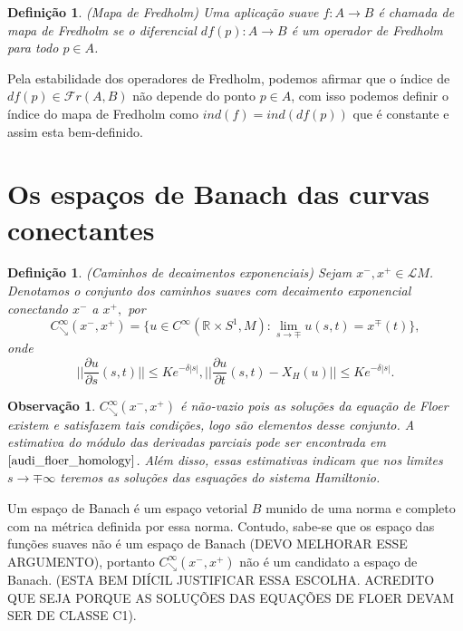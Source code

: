 \documentclass[12pt]{book}
\newtheorem{definicao}[teorema]{Definição}
\newtheorem{observacao}[teorema]{Observação}
\newcommand{\aplicaoessuavesreatacirculo}{C^{\infty}(\retacartesianocirculo, M)}
\newcommand{\caminhosdecaimentoexponencial}[2]{C^{\infty}_{\searrow}(#1, #2)}
\newcommand{\caminhosdecaimentoexponencialpadrao}{\caminhosdecaimentoexponencial{x^{-}}{x^{+}}}
\newcommand{\circulo}{S^{1}}
\newcommand{\derivadaparcial}[2]{\frac{\partial #1}{\partial #2}}
\newcommand{\normagrande}[1]{\Big|\Big|#1\Big|\Big|}
\newcommand{\operadoresfredholm}[2]{\mathcal{F}r(#1, #2)}
\newcommand{\retacartesianocirculo}{\real{} \times \circulo}
\newcommand{\real}[1]{\mathbb{R}^{#1}}
\newcommand{\solucoesperiodicascontrateis}{\mathcal{L}M}
\newcommand{\vermelho}[1]{{\color{red}#1}}
\begin{document}
	\begin{definicao}
		(Mapa de Fredholm) Uma aplicação suave $f: A \to B$ é chamada de mapa de Fredholm se o diferencial $df(p): A \to B$ é um operador de Fredholm para todo $p \in A$.
	\end{definicao}
	
	
	Pela estabilidade dos operadores de Fredholm, podemos afirmar que o índice de $df(p) \in \operadoresfredholm{A}{B}$ não depende do ponto $p \in A$, com isso podemos definir o índice do mapa de Fredholm como $ind(f)=ind(df(p))$ que é constante e assim esta bem-definido.
	
	\section{Os espaços de Banach das curvas conectantes}
	
	\begin{definicao}\label{definicao_caminhos_decaimentos_exponenciais}
		(Caminhos de decaimentos exponenciais) Sejam $x^{-}, x^{+} \in \solucoesperiodicascontrateis$. Denotamos o conjunto dos caminhos suaves com decaimento exponencial conectando $x^{-}$ a $x^{+}, $ por
		$$
		\caminhosdecaimentoexponencialpadrao = \{u \in \aplicaoessuavesreatacirculo: \lim_{s \to \mp} u(s,t) = x^{\mp}(t) \},
		$$
		onde 
		$$
		\normagrande{\derivadaparcial{u}{s}(s,t)} \leq Ke^{-\delta|s|},  \normagrande{\derivadaparcial{u}{t}(s,t) -X_{H}(u)} \leq Ke^{-\delta|s|}.
		$$
	\end{definicao}
	
	\begin{observacao}
		$\caminhosdecaimentoexponencialpadrao$ é não-vazio pois as soluções da equação de Floer existem e satisfazem tais condições, logo são elementos desse conjunto. A estimativa do módulo das derivadas parciais pode ser encontrada em $\cite{audi_floer_homology}$. Além disso, essas estimativas indicam que nos limites $s\to \mp \infty$ teremos as soluções das esquações do sistema Hamiltonio.
	\end{observacao}
	
	Um espaço de Banach é um espaço vetorial $B$ munido de uma norma e completo com na métrica definida por essa norma. Contudo, sabe-se que os espaço das funções suaves não é um espaço de Banach \vermelho{(DEVO MELHORAR ESSE ARGUMENTO)}, portanto $\caminhosdecaimentoexponencialpadrao$ não é um candidato a espaço de Banach. \vermelho{(ESTA BEM DIÍCIL JUSTIFICAR ESSA ESCOLHA. ACREDITO QUE SEJA PORQUE AS SOLUÇÕES DAS EQUAÇÕES DE FLOER DEVAM SER DE CLASSE C1).}
	
\end{document}

